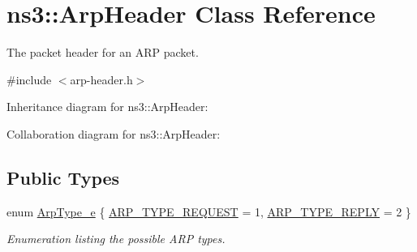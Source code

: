 \hypertarget{classns3_1_1ArpHeader}{}\section{ns3\+:\+:Arp\+Header Class Reference}
\label{classns3_1_1ArpHeader}


The packet header for an A\+RP packet.  




{\ttfamily \#include $<$arp-\/header.\+h$>$}



Inheritance diagram for ns3\+:\+:Arp\+Header\+:


Collaboration diagram for ns3\+:\+:Arp\+Header\+:
\subsection*{Public Types}
\begin{DoxyCompactItemize}
\item 
enum \hyperlink{classns3_1_1ArpHeader_a8e24939c2a622b1332b033804a8102a1}{Arp\+Type\+\_\+e} \{ \hyperlink{classns3_1_1ArpHeader_a8e24939c2a622b1332b033804a8102a1a51160e91cae796806fa724757c5c5f7c}{A\+R\+P\+\_\+\+T\+Y\+P\+E\+\_\+\+R\+E\+Q\+U\+E\+ST} = 1, 
\hyperlink{classns3_1_1ArpHeader_a8e24939c2a622b1332b033804a8102a1ab6657bde914a6a9d74606fb42c61c2a3}{A\+R\+P\+\_\+\+T\+Y\+P\+E\+\_\+\+R\+E\+P\+LY} = 2
 \}\begin{DoxyCompactList}\small\item\em Enumeration listing the possible A\+RP types. \end{DoxyCompactList}
\end{DoxyCompactItemize}
